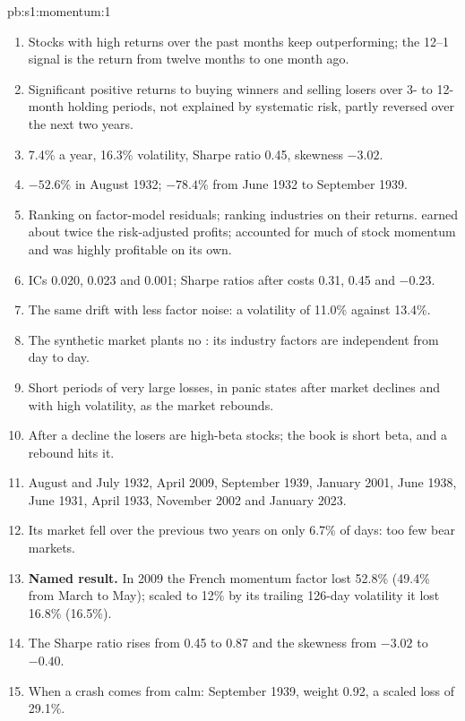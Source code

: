 \begin{solution}{pb:s1:momentum:1}
\begin{enumerate}
\item Stocks with high returns over the past months keep outperforming; the 12--1 signal is the return from twelve months to one month ago.
\item Significant positive returns to buying winners and selling losers over 3- to 12-month holding periods, not explained by systematic risk, partly
reversed over the next two years.
\item 7.4\% a year, 16.3\% volatility, Sharpe ratio 0.45, skewness $-3.02$.
\item $-52.6\%$ in August 1932; $-78.4\%$ from June 1932 to September 1939.
\item Ranking on factor-model residuals; ranking industries on their returns.  earned about twice the risk-adjusted profits;  accounted for much of stock momentum and was highly profitable on its own.
\item ICs 0.020, 0.023 and 0.001; Sharpe ratios after costs 0.31, 0.45 and $-0.23$.
\item The same drift with less factor noise: a volatility of 11.0\% against 13.4\%.
\item The synthetic market plants no : its industry factors are independent from day to day.
\item Short periods of very large losses, in panic states after market declines and with high volatility, as the market rebounds.
\item After a decline the losers are high-beta stocks; the book is short beta, and a rebound hits it.
\item August and July 1932, April 2009, September 1939, January 2001, June 1938, June 1931, April 1933, November 2002 and January 2023.
\item Its market fell over the previous two years on only 6.7\% of days: too few bear markets.
\item \textbf{Named result.} In 2009 the French momentum factor lost 52.8\% (49.4\% from March to May); scaled to 12\% by its trailing 126-day volatility it
lost 16.8\% (16.5\%).
\item The Sharpe ratio rises from 0.45 to 0.87 and the skewness from $-3.02$ to $-0.40$.
\item When a crash comes from calm: September 1939, weight 0.92, a scaled loss of 29.1\%.

\end{enumerate}
\end{solution}
